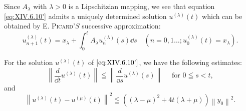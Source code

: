 Since $A_{\lambda}$ with $\lambda > 0$ is a Lipschitzian mapping, we see that equation \eqref{eq:XIV.6.10'} admits a uniquely determined solution $u^{(\lambda)}(t)$ which can be obtained by E. \textsc{Picard}'$S$ successive approximation: 
\begin{equation}\tag{10''}\label{eq:XIV.6.10''}
u _{n+1} ^{(\lambda)} (t) = x _{\lambda} + \int_{0} ^{t} A _{\lambda} u _{n} ^{(\lambda)} (s) \dd s \quad (n = 0, 1 \dots ; u _{0} ^{(\lambda)} (t) = x _{\lambda}).
\end{equation}

\begin{lemma}\label{lem:XIV.6.Lemma.3} For the solution $u^{(\lambda)}(t)$ of $\eqref{eq:XIV.6.10'}$, we have the following estimates: 
\begin{equation}\label{eq:XIV.6.11}
\left\| \frac {d}{\dd t} u ^{(\lambda)} (t) \right\| \leqq \left\| \frac {d}{\dd s} u ^{(\lambda)} (s) \right\| \quad \text{ for } 0 \leqq s < t,
\end{equation}
and 
\begin{equation}\label{eq:XIV.6.12}
\left\| u ^{(\lambda)} (t) - u ^{(\mu)} (t) \right\| ^{2} \leqq \left((\lambda - \mu) ^{2} + 4 t (\lambda + \mu)\right) \left\| y _{0} \right\| ^{2}.
\end{equation}
\end{lemma}

